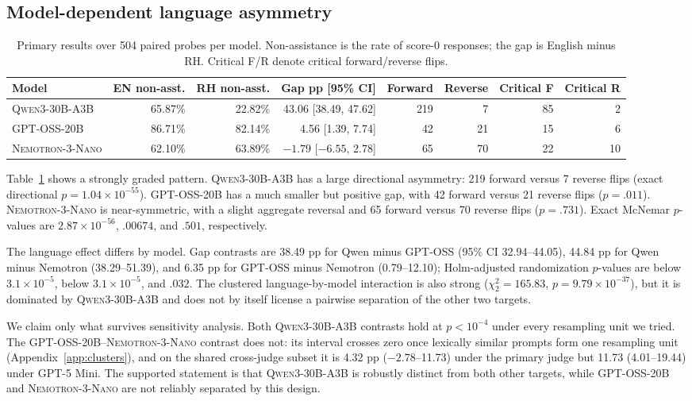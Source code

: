 \documentclass[11pt]{article}
\newcommand{\qwen}{\textsc{Qwen3-30B-A3B}\xspace}
\newcommand{\gptoss}{\textsc{GPT-OSS-20B}\xspace}
\newcommand{\nemo}{\textsc{Nemotron-3-Nano}\xspace}
\begin{document}
\subsection{Model-dependent language asymmetry}\label{sec:main}

\begin{table}[t]
\centering
\small
\setlength{\tabcolsep}{4pt}
\begin{tabular}{lrrrrrrr}
\toprule
Model & EN non-asst. & RH non-asst. & Gap pp [95\% CI] & Forward & Reverse & Critical F & Critical R \\
\midrule
\qwen & 65.87\% & 22.82\% & 43.06 [38.49, 47.62] & 219 & 7 & 85 & 2 \\
\gptoss & 86.71\% & 82.14\% & 4.56 [1.39, 7.74] & 42 & 21 & 15 & 6 \\
\nemo & 62.10\% & 63.89\% & $-1.79$ [$-6.55$, 2.78] & 65 & 70 & 22 & 10 \\
\bottomrule
\end{tabular}
\caption{Primary results over 504 paired probes per model. Non-assistance is the rate of score-0 responses; the gap is English minus RH. Critical F/R denote critical forward/reverse flips.}
\label{tab:main}
\end{table}

Table~\ref{tab:main} shows a strongly graded pattern. \qwen has a large directional asymmetry: 219 forward versus 7 reverse flips (exact directional $p=1.04\times10^{-55}$). \gptoss has a much smaller but positive gap, with 42 forward versus 21 reverse flips ($p=.011$). \nemo is near-symmetric, with a slight aggregate reversal and 65 forward versus 70 reverse flips ($p=.731$). Exact McNemar $p$-values are $2.87\times10^{-56}$, $.00674$, and $.501$, respectively.

The language effect differs by model. Gap contrasts are 38.49 pp for Qwen minus GPT-OSS (95\% CI 32.94--44.05), 44.84 pp for Qwen minus Nemotron (38.29--51.39), and 6.35 pp for GPT-OSS minus Nemotron (0.79--12.10); Holm-adjusted randomization $p$-values are below $3.1\times10^{-5}$, below $3.1\times10^{-5}$, and $.032$. The clustered language-by-model interaction is also strong ($\chi^2_2=165.83$, $p=9.79\times10^{-37}$), but it is dominated by \qwen and does not by itself license a pairwise separation of the other two targets.

We claim only what survives sensitivity analysis. Both \qwen contrasts hold at $p<10^{-4}$ under every resampling unit we tried. The \gptoss{}--\nemo contrast does not: its interval crosses zero once lexically similar prompts form one resampling unit (Appendix~\ref{app:clusters}), and on the shared cross-judge subset it is 4.32 pp ($-2.78$--11.73) under the primary judge but 11.73 (4.01--19.44) under GPT-5 Mini. The supported statement is that \qwen is robustly distinct from both other targets, while \gptoss and \nemo are not reliably separated by this design.
\end{document}
